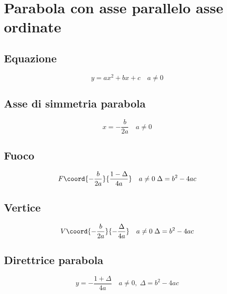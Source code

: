 
\chapter{Parabola con asse parallelo asse ordinate}
\section{Equazione}
\begin{equation*}
y=ax^2+bx+c\quad a\neq0
\end{equation*}
\section{Asse di simmetria parabola}
\begin{equation*}
x=-\dfrac{b}{2a}\quad a\neq0
\end{equation*}
\section{Fuoco}
\begin{equation*}
F\coord{-\dfrac{b}{2a}}{\dfrac{1-\Delta}{4a}}\quad  a\neq0\; \Delta=b^2-4ac
\end{equation*}
\section{Vertice}
\begin{equation*}
V\coord{-\dfrac{b}{2a}}{-\dfrac{\Delta}{4a}}\quad  a\neq0\; \Delta=b^2-4ac
\end{equation*}
\section{Direttrice parabola}
\begin{equation*}
y=-\dfrac{1+\Delta}{4a}\quad  a\neq0,\; \Delta=b^2-4ac
\end{equation*}